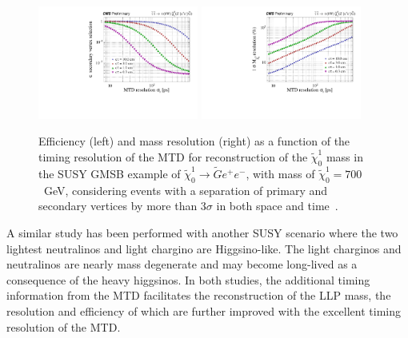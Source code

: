 \begin{figure}[t]\begin{center}
\includegraphics[width=0.47\textwidth]{figures/MTD/171025_52.pdf}
\includegraphics[width=0.47\textwidth]{figures/MTD/171025_53.pdf}
\caption{
Efficiency (left) and mass resolution (right) as a function of the timing resolution of the MTD for reconstruction of the $\tilde{\chi}_0^1$ mass in the SUSY GMSB example of $\tilde{\chi}_0^1 \to \tilde{G} e^{+} e^{-}$, with mass of $\tilde{\chi}_0^1=700$~GeV, considering events with a separation of primary and secondary vertices by more than $3\sigma$ in both space and time~\cite{MTD_TP}.
}
\label{fig:cmsupgrade_mtd}
\end{center}
\end{figure}

A similar study has been performed with another SUSY scenario where the two lightest neutralinos and light chargino are Higgsino-like. The light charginos and neutralinos are nearly mass degenerate and may become long-lived as a consequence of the heavy higgsinos. In both studies, the additional timing information from the MTD facilitates the reconstruction of the LLP mass, the resolution and efficiency of which are further improved with the excellent timing resolution of the MTD.

